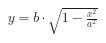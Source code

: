 \documentclass[preview]{standalone}
\begin{document}
\begin{align*}
y=b \cdot \sqrt{1 - \frac{x^2}{a^2}}
\end{align*}
\end{document}

